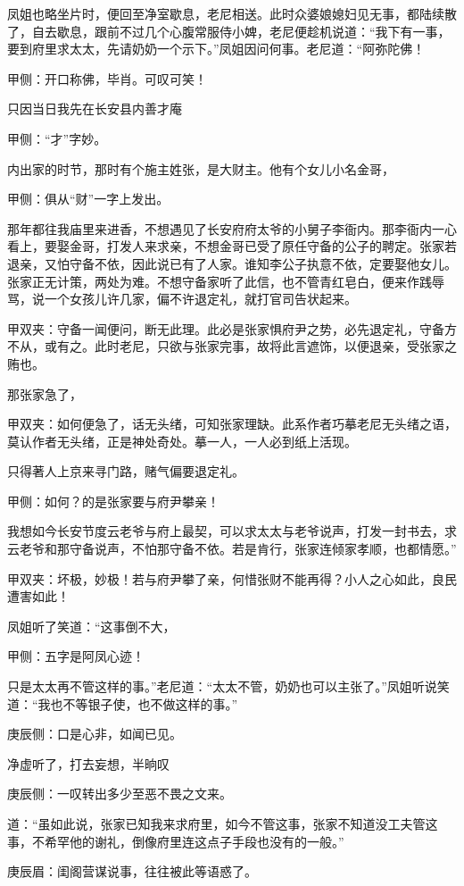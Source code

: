 \begin{parag}
    凤姐也略坐片时，便回至净室歇息，老尼相送。此时众婆娘媳妇见无事，都陆续散了，自去歇息，跟前不过几个心腹常服侍小婢，老尼便趁机说道：“我下有一事，要到府里求太太，先请奶奶一个示下。”凤姐因问何事。老尼道：“阿弥陀佛！\begin{note}甲侧：开口称佛，毕肖。可叹可笑！\end{note}只因当日我先在长安县内善才庵\begin{note}甲侧：“才”字妙。\end{note}内出家的时节，那时有个施主姓张，是大财主。他有个女儿小名金哥，\begin{note}甲侧：俱从“财”一字上发出。\end{note}那年都往我庙里来进香，不想遇见了长安府府太爷的小舅子李衙内。那李衙内一心看上，要娶金哥，打发人来求亲，不想金哥已受了原任守备的公子的聘定。张家若退亲，又怕守备不依，因此说已有了人家。谁知李公子执意不依，定要娶他女儿。张家正无计策，两处为难。不想守备家听了此信，也不管青红皂白，便来作践辱骂，说一个女孩儿许几家，偏不许退定礼，就打官司告状起来。\begin{note}甲双夹：守备一闻便问，断无此理。此必是张家惧府尹之势，必先退定礼，守备方不从，或有之。此时老尼，只欲与张家完事，故将此言遮饰，以便退亲，受张家之贿也。\end{note}那张家急了，\begin{note}甲双夹：如何便急了，话无头绪，可知张家理缺。此系作者巧摹老尼无头绪之语，莫认作者无头绪，正是神处奇处。摹一人，一人必到纸上活现。\end{note}只得著人上京来寻门路，赌气偏要退定礼。\begin{note}甲侧：如何？的是张家要与府尹攀亲！\end{note}我想如今长安节度云老爷与府上最契，可以求太太与老爷说声，打发一封书去，求云老爷和那守备说声，不怕那守备不依。若是肯行，张家连倾家孝顺，也都情愿。”\begin{note}甲双夹：坏极，妙极！若与府尹攀了亲，何惜张财不能再得？小人之心如此，良民遭害如此！\end{note}
\end{parag}


\begin{parag}
    凤姐听了笑道：“这事倒不大，\begin{note}甲侧：五字是阿凤心迹！\end{note}只是太太再不管这样的事。”老尼道：“太太不管，奶奶也可以主张了。”凤姐听说笑道：“我也不等银子使，也不做这样的事。”\begin{note}庚辰侧：口是心非，如闻已见。\end{note}净虚听了，打去妄想，半晌叹\begin{note}庚辰侧：一叹转出多少至恶不畏之文来。\end{note}道：“虽如此说，张家已知我来求府里，如今不管这事，张家不知道没工夫管这事，不希罕他的谢礼，倒像府里连这点子手段也没有的一般。”\begin{note}庚辰眉：闺阁营谋说事，往往被此等语惑了。\end{note}
\end{parag}


